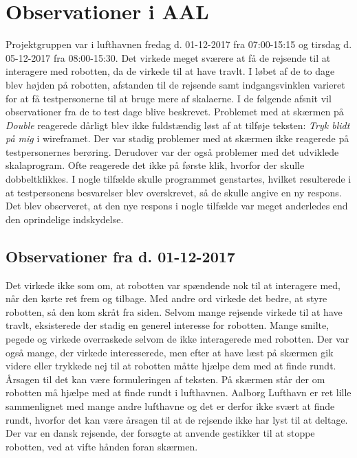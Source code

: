 \section{Observationer i AAL}
\label{TestAfSkalaLufthavnsBesog}
%
Projektgruppen var i lufthavnen fredag d. 01-12-2017 fra 07:00-15:15 og tirsdag d. 05-12-2017 fra 08:00-15:30. Det virkede meget sværere at få de rejsende til at interagere med robotten, da de virkede til at have travlt. I løbet af de to dage blev højden på robotten, afstanden til de rejsende samt indgangsvinklen varieret for at få testpersonerne til at bruge mere af skalaerne. I de følgende afsnit vil observationer fra de to test dage blive beskrevet.\blankline
%
Problemet med at skærmen på \textit{Double} reagerede dårligt blev ikke fuldstændig løst af at tilføje teksten: \textit{Tryk blidt på mig} i wireframet. Der var stadig problemer med at skærmen ikke reagerede på testpersonernes berøring. Derudover var der også problemer med det udviklede skalaprogram. Ofte reagerede det ikke på første klik, hvorfor der skulle dobbeltklikkes. I nogle tilfælde skulle programmet genstartes, hvilket resulterede i at testpersonens besvarelser blev overskrevet, så de skulle angive en ny respons. Det blev observeret, at den nye respons i nogle tilfælde var meget anderledes end den oprindelige indskydelse.

\subsection{Observationer fra d. 01-12-2017}
Det virkede ikke som om, at robotten var spændende nok til at interagere med, når den kørte ret frem og tilbage. Med andre ord virkede det bedre, at styre robotten, så den kom skråt fra siden. Selvom mange rejsende virkede til at have travlt, eksisterede der stadig en generel interesse for robotten. Mange smilte, pegede og virkede overraskede selvom de ikke interagerede med robotten. Der var også mange, der virkede interesserede, men efter at have læst på skærmen gik videre eller trykkede nej til at robotten måtte hjælpe dem med at finde rundt. Årsagen til det kan være formuleringen af teksten. På skærmen står der om robotten må hjælpe med at finde rundt i lufthavnen. Aalborg Lufthavn er ret lille sammenlignet med mange andre lufthavne og det er derfor ikke svært at finde rundt, hvorfor det kan være årsagen til at de rejsende ikke har lyst til at deltage. Der var en dansk rejsende, der forsøgte at anvende gestikker til at stoppe robotten, ved at vifte hånden foran skærmen.

